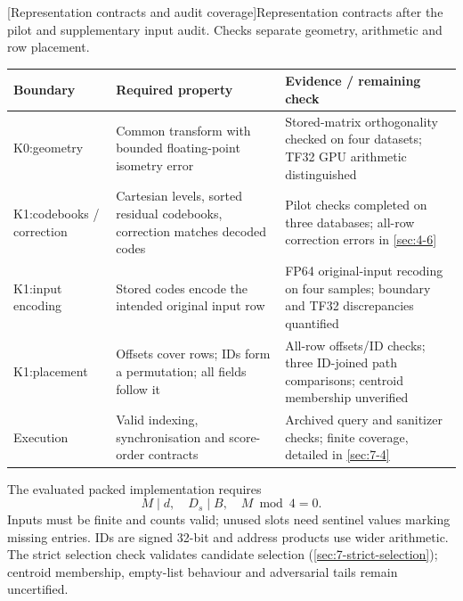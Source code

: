 \par\medskip\noindent\begin{minipage}{\linewidth}
\captionsetup{hypcap=false}
\centering
{}[Representation contracts and audit coverage]{Representation contracts after the pilot and supplementary input audit.
Checks separate geometry, arithmetic and row placement.}
\label{tab:4-contracts}
\footnotesize\setlength{\tabcolsep}{4pt}
\begin{tabularx}{\linewidth}{@{}>{\raggedright\arraybackslash}p{1.8cm}*{2}{>{\raggedright\arraybackslash}X}@{}}
\toprule
Boundary & Required property & Evidence / remaining check \\
\midrule
K0:\newline geometry & Common transform with bounded floating-point isometry error & Stored-matrix orthogonality checked on four datasets; TF32 GPU arithmetic distinguished \\
K1:\newline codebooks / correction & Cartesian levels, sorted residual codebooks, correction matches decoded codes & Pilot checks completed on three databases; all-row correction errors in \cref{sec:4-6} \\
K1:\newline input encoding & Stored codes encode the intended original input row & FP64 original-input recoding on four samples; boundary and TF32 discrepancies quantified \\
K1:\newline placement & Offsets cover rows; IDs form a permutation; all fields follow it & All-row offsets/ID checks; three ID-joined path comparisons; centroid membership unverified \\
Execution & Valid indexing, synchronisation and score-order contracts & Archived query and sanitizer checks; finite coverage, detailed in \cref{sec:7-4} \\
\bottomrule
\end{tabularx}
\end{minipage}\par\medskip

The evaluated packed implementation requires
\[
 M\mid d,\quad D_s\mid B,\quad M\bmod4=0.
\]
Inputs must be finite and counts valid; unused slots need sentinel
values marking missing entries. IDs are signed 32-bit and address
products use wider arithmetic. The strict selection check validates candidate selection
(\cref{sec:7-strict-selection}); centroid membership, empty-list
behaviour and adversarial tails remain uncertified.
